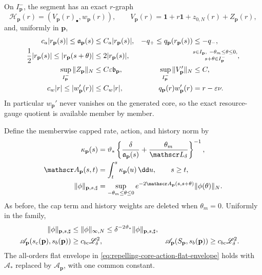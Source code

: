 \begin{lemma}
\begin{equation}
                                                        \label{eq:oe-family-core-intervals}
\end{equation}
On \(I_{\mathbf p}^-\), the segment has an exact \(r\)-graph
\begin{equation}
 \mathcal H_{\mathbf p}(r)
 =(V_{\mathbf p}(r)_\bullet,w_{\mathbf p}(r)),
 \qquad
 V_{\mathbf p}(r)
 =\mathbf1+r\mathbf1+z_{0,N}(r)+Z_{\mathbf p}(r),           \label{eq:oe-family-core-r-graph}
\end{equation}
and, uniformly in \(\mathbf p\),
\begin{align}
 c_a|r_{\mathbf p}(s)|
 \le\mathfrak a_{\mathbf p}(s)
 &\le C_a|r_{\mathbf p}(s)|,
 &-q_+\le q_{\mathbf p}(r_{\mathbf p}(s))&\le-q_-,\notag\\
 \frac12|r_{\mathbf p}(s)|
 \le |r_{\mathbf p}(s+\theta)|
 &\le2|r_{\mathbf p}(s)|,
 &&\substack{s\in I_{\mathbf p},\ -\theta_m\le\theta\le0,\\
             s+\theta\in I_{\mathbf p}^-},               \label{eq:oe-family-core-local-geometry}\\
 \sup_{I_{\mathbf p}^-}\|Z_{\mathbf p}\|_N
 &\le C\varepsilon\mathfrak b_{\mathbf p},&
 \sup_{I_{\mathbf p}^-}\|V_{\mathbf p}'\|_N&\le C,\notag\\
 c_w|r|\le |w_{\mathbf p}'(r)|
 &\le C_w|r|,&
 q_{\mathbf p}(r)w_{\mathbf p}'(r)&=r-\varepsilon\nu.
                                                        \label{eq:oe-family-core-graph-ledger}
\end{align}
In particular \(w_{\mathbf p}'\) never vanishes on the generated core, so
the exact resource-gauge quotient is available member by member.

Define the memberwise capped rate, action, and history norm by
\begin{align}
 \kappa_{\mathbf p}(s)
 &=\vartheta_*
   \left\{\frac{\delta}{\mathfrak a_{\mathbf p}(s)}
           +\frac{\theta_m}{\mathscr L_\delta}\right\}^{-1},\notag\\
 \mathscr A_{\mathbf p}(s,t)
 &=\int_t^s\kappa_{\mathbf p}(u)\,\dd u,\qquad s\ge t,\notag\\
 \|\phi\|_{\mathbf p,s,\sharp}
 &=\sup_{-\theta_m\le\theta\le0}
   e^{-2\mathscr A_{\mathbf p}(s,s+\theta)}
       \|\phi(\theta)\|_N.                    \label{eq:oe-family-core-action-and-norm}
\end{align}
As before, the cap term and history weights are deleted when
\(\theta_m=0\).  Uniformly in the family,
\begin{align}
 \|\phi\|_{\mathbf p,s,\sharp}
 &\le\|\phi\|_{\infty,N}
 \le\delta^{-2\vartheta_*}
       \|\phi\|_{\mathbf p,s,\sharp},\notag\\
 \mathscr A_{\mathbf p}(s_c(\mathbf p),s_b(\mathbf p))
 &\ge c_{bc}\mathscr L_\delta^2,
 &\mathscr A_{\mathbf p}(S_{\mathbf p},s_b(\mathbf p))
 &\ge c_{bc}\mathscr L_\delta^2.              \label{eq:oe-family-core-action-bounds}
\end{align}
The all-orders flat envelope in
\cref{eq:repelling-core-action-flat-envelope} holds with
\(\mathscr A_*\) replaced by \(\mathscr A_{\mathbf p}\), with one common
constant.


\end{lemma}
